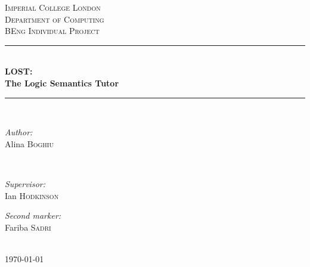 \documentclass{report}
\begin{document}

\begin{titlepage}
\newcommand{\HRule}{\rule{\linewidth}{0.5mm}}
\center
\textsc{\LARGE Imperial College London} \\[0.5cm]
\textsc{\Large Department of Computing} \\[0.5cm]
\textsc{\large BEng Individual Project} \\[1.5cm]
\HRule \\[0.3cm]
{\huge \bfseries LOST: \\[0.2cm] The Logic Semantics Tutor} \\[0.3cm]
\HRule \\[1.5cm]

\begin{minipage}{0.4\textwidth}
\begin{flushleft} \large \emph{Author:} \\
 Alina  \textsc{Boghiu}
\end{flushleft}
\end{minipage}~
\begin{minipage}{0.4\textwidth}
\begin{flushright} \large \emph{Supervisor:} \\
 Ian \textsc{Hodkinson}
\end{flushright}
\begin{flushright} \large \emph{Second marker:} \\
 Fariba \textsc{Sadri}
\end{flushright}
\end{minipage}\\[4cm]
{\large \today}\\[3cm]
\vfill
\end{titlepage}

\end{document}
